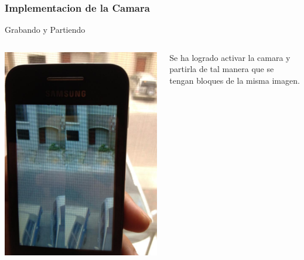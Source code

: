 \documentclass[serif,11pt]{beamer}
\begin{document}
		\begin{frame}
			\frametitle{Implementacion de la Camara}
				\begin{block}{Grabando y Partiendo}
					\begin{columns}
						 \hspace{0.1cm}
						\includegraphics[width=\textwidth]{vidcam} 

						Se ha logrado activar la camara y partirla de tal manera que se tengan bloques de la misma imagen.
						
						
					\end{columns}
				\end{block}
		\end{frame}
\end{document}
